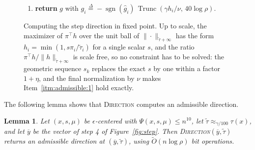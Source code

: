 \documentclass[11pt]{article}
\newtheorem{lemma}{Lemma}[section]
\newcommand{\Trunc}{\operatorname{Trunc}}
\renewcommand{\O}{\widetilde O}
\newcommand{\tautil}{\widetilde{\tau}}
\newcommand{\ghat}{\widehat{g}}
\newcommand{\sgn}{\operatorname{sgn}}
\newcommand{\defeq}{\stackrel{\Delta}{=}}
\newenvironment{fminipage}%
  {\begin{Sbox}\begin{minipage}}%
  {\end{minipage}\end{Sbox}\fbox{\TheSbox}}
\newenvironment{algbox}[0]{\vskip 0.2in
\noindent 
\begin{fminipage}{6.3in}
}{
\end{fminipage}
\vskip 0.2in
}
\begin{document}
\begin{figure}[H]
\begin{algbox}
\begin{enumerate}
  $h \defeq h^{(k^{\star})}$,
  $\nu \defeq \nu_{k^{\star}}$.
\item \textbf{return} $g$ with
  $g_i \defeq - \sgn(\ghat_i) \, \Trunc(\gamma h_i / \nu, \, 40 \log \rho)$.
\end{enumerate}
\end{algbox}
\caption{Computing the step direction in fixed point.  Up to scale,
the maximizer of $\pi^\top h$ over the unit ball of
$\|\cdot\|_{\tautil + \infty}$ has the form
$h_i = \min(1, s \pi_i / \tautil_i)$ for a single scalar
$s$, and the ratio
$\pi^\top h / \|h\|_{\tautil + \infty}$ is scale free, so no constraint
has to be solved: the geometric sequence $s_k$ replaces the exact
$s$ by one within a factor
$1 + \eta$, and the final normalization by
$\nu$ makes Item~\ref{itm:admissible:1} hold exactly.}
\label{fig:direction}
\end{figure}

The following lemma shows that \textsc{Direction} computes an admissible
direction.

\begin{lemma}
\label{lem:direction}
Let $(x, s, \mu)$ be
$\epsilon$-centered with
$\Psi(x, s, \mu) \le n^{10}$, let
$\tautil \approx_{\gamma / 100} \tau(x)$, and let
$\overline{y}$ be the vector of step 4 of Figure~\ref{fig:step}.
Then \textsc{Direction}$(\overline{y}, \tautil)$ returns an admissible direction
at $(\overline{y}, \tautil)$, using
$\O(n \log \rho)$ bit operations.
\end{lemma}
\end{document}
